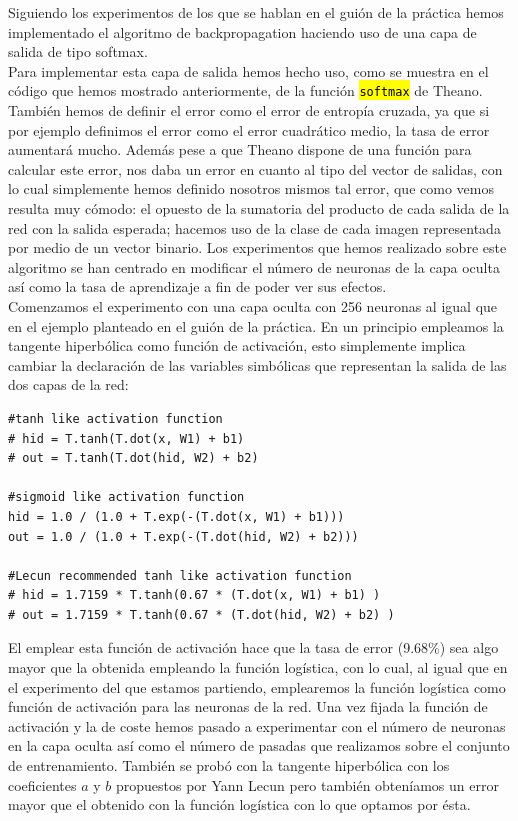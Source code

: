 \documentclass[10pt,a4paper]{article}
\newcommand{\code}[1]{\sethlcolor{light-gray}\hl{\texttt{#1}}} %
\begin{document}
Siguiendo los experimentos de los que se hablan en el guión de la práctica hemos implementado el algoritmo de backpropagation haciendo uso de una capa de salida de tipo softmax.\\

Para implementar esta capa de salida hemos hecho uso, como se muestra en el código que hemos mostrado anteriormente, de la función \code{softmax} de Theano. También hemos de definir el error como el error de entropía cruzada, ya que si por ejemplo definimos el error como el error cuadrático medio, la tasa de error aumentará mucho. Además pese a que Theano dispone de una función para calcular este error, nos daba un error en cuanto al tipo del vector de salidas, con lo cual simplemente hemos definido nosotros mismos tal error, que como vemos resulta muy cómodo: el opuesto de la sumatoria del producto de cada salida de la red con la salida esperada; hacemos uso de la clase de cada imagen representada por medio de un vector binario. Los experimentos que hemos realizado sobre este algoritmo se han centrado en modificar el número de neuronas de la capa oculta así como la tasa de aprendizaje a fin de poder ver sus efectos.\\

Comenzamos el experimento con una capa oculta con 256 neuronas al igual que en el ejemplo planteado en el guión de la práctica. En un principio empleamos la tangente hiperbólica como función de activación, esto simplemente implica cambiar la declaración de las variables simbólicas que representan la salida de las dos capas de la red:

\begin{lstlisting}
#tanh like activation function
# hid = T.tanh(T.dot(x, W1) + b1)
# out = T.tanh(T.dot(hid, W2) + b2)

#sigmoid like activation function
hid = 1.0 / (1.0 + T.exp(-(T.dot(x, W1) + b1)))
out = 1.0 / (1.0 + T.exp(-(T.dot(hid, W2) + b2)))

#Lecun recommended tanh like activation function
# hid = 1.7159 * T.tanh(0.67 * (T.dot(x, W1) + b1) )
# out = 1.7159 * T.tanh(0.67 * (T.dot(hid, W2) + b2) )
\end{lstlisting}

El emplear esta función de activación hace que la tasa de error (9.68\%) sea algo mayor que la obtenida empleando la función logística, con lo cual, al igual que en el experimento del que estamos partiendo, emplearemos la función logística como función de activación para las neuronas de la red. Una vez fijada la función de activación y la de coste hemos pasado a experimentar con el número de neuronas en la capa oculta así como el número de pasadas que realizamos sobre el conjunto de entrenamiento. También se probó con la tangente hiperbólica con los coeficientes $a$ y $b$ propuestos por Yann Lecun pero también obteníamos un error mayor que el obtenido con la función logística con lo que optamos por ésta.\\
\end{document}
